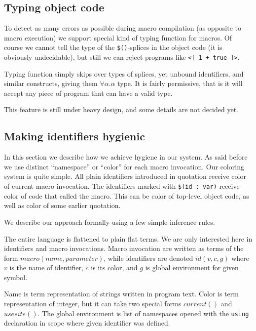 \documentclass{llncs}
\begin{document}
\subsection{Typing object code}

To detect as many errors as possible during macro compilation (as opposite to
macro execution) we support special kind of typing function for macros.
Of course we cannot tell the type of the \verb,$(),-splices in the object
code (it is obviously undecidable), but still we can reject programs like
\verb,<[ 1 + true ]>,.

Typing function simply skips over types of splices, yet unbound
identifiers, and similar constructs, giving them $\forall \alpha
. \alpha$ type. It is fairly permissive, that is it will accept any
piece of program that can have a valid type.

This feature is still under heavy design, and some details are not decided yet.


\subsection{Making identifiers hygienic}
In this section we describe how we achieve hygiene in our system.
As said before we use distinct ``namespace'' or ``color'' for each macro
invocation. Our coloring system is quite simple.  All plain identifiers
introduced in quotation receive color of current macro invocation. The
identifiers marked with \verb,$(id : var), receive color of code that
called the macro. This can be color of top-level object code, as well
as color of some earlier quotation.

We describe our approach formally using a few simple inference rules.

The entire language is flattened to plain flat terms. We are only
interested here in identifiers and macro invocations.  Macro invocation
are written as terms of the form $macro(name, parameter)$, while
identifiers are denoted $id(v,c,g)$ where $v$ is the name of identifier,
$c$ is its color, and $g$ is global environment for given symbol.

Name is term representation of strings written in program text. Color
is term representation of integer, but it can take two special forms
$current()$ and $usesite()$. The global environment is list of namespaces
opened with the \verb,using, declaration in scope where given identifier
was defined.
\end{document}
